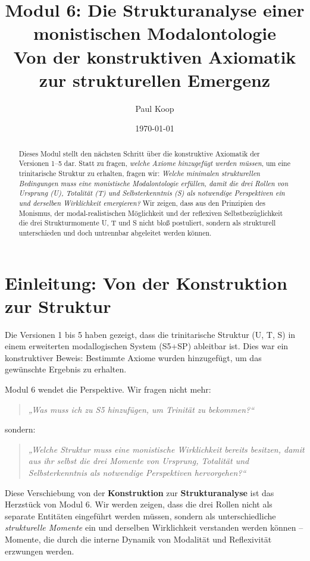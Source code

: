 \documentclass[12pt,a4paper]{article}
\title{Modul 6: Die Strukturanalyse einer monistischen Modalontologie \\
\large Von der konstruktiven Axiomatik zur strukturellen Emergenz}
\author{Paul Koop}
\date{\today}
\begin{document}
\maketitle

\begin{abstract}
Dieses Modul stellt den nächsten Schritt über die konstruktive Axiomatik der Versionen 1–5 dar. Statt zu fragen, \emph{welche Axiome hinzugefügt werden müssen}, um eine trinitarische Struktur zu erhalten, fragen wir: \emph{Welche minimalen strukturellen Bedingungen muss eine monistische Modalontologie erfüllen, damit die drei Rollen von Ursprung (U), Totalität (T) und Selbsterkenntnis (S) als notwendige Perspektiven ein und derselben Wirklichkeit emergieren?} Wir zeigen, dass aus den Prinzipien des Monismus, der modal-realistischen Möglichkeit und der reflexiven Selbstbezüglichkeit die drei Strukturmomente U, T und S nicht bloß postuliert, sondern als strukturell unterschieden und doch untrennbar abgeleitet werden können.
\end{abstract}

\section{Einleitung: Von der Konstruktion zur Struktur}

Die Versionen 1 bis 5 haben gezeigt, dass die trinitarische Struktur (U, T, S) in einem erweiterten modallogischen System (S5+SP) ableitbar ist. Dies war ein konstruktiver Beweis: Bestimmte Axiome wurden hinzugefügt, um das gewünschte Ergebnis zu erhalten.

Modul 6 wendet die Perspektive. Wir fragen nicht mehr:
\begin{quote}
\textit{„Was muss ich zu S5 hinzufügen, um Trinität zu bekommen?“}
\end{quote}
sondern:
\begin{quote}
\textit{„Welche Struktur muss eine monistische Wirklichkeit bereits besitzen, damit aus ihr selbst die drei Momente von Ursprung, Totalität und Selbsterkenntnis als notwendige Perspektiven hervorgehen?“}
\end{quote}

Diese Verschiebung von der \textbf{Konstruktion} zur \textbf{Strukturanalyse} ist das Herzstück von Modul 6. Wir werden zeigen, dass die drei Rollen nicht als separate Entitäten eingeführt werden müssen, sondern als unterschiedliche \emph{strukturelle Momente} ein und derselben Wirklichkeit verstanden werden können – Momente, die durch die interne Dynamik von Modalität und Reflexivität erzwungen werden.
\end{document}
